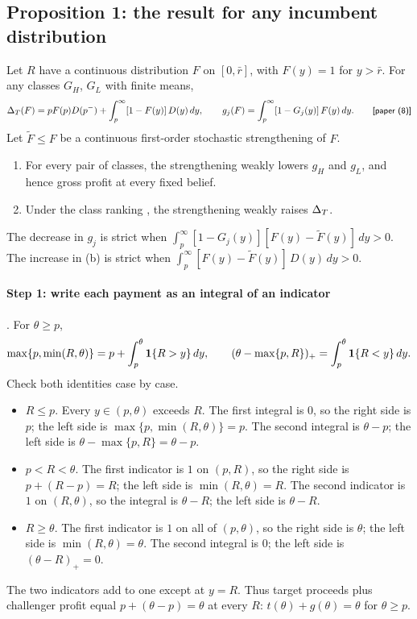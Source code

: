 \pagebreak
\subsection{Proposition 1: the result for any incumbent distribution}\label{sec:03_auction-prop1}

\begin{resultbox}
Let \(R\) have a continuous distribution \(F\) on \([0,\bar r]\), with \(F(y)=1\) for \(y>\bar r\). For any
classes \(G_H\), \(G_L\) with finite means,
\[
\DT(F)=pF(p)D(p^-)+\int_p^\infty[1-F(y)]\,D(y)\,dy,\qquad
g_j(F)=\int_p^\infty[1-G_j(y)]\,F(y)\,dy. \tag*{\paper{(8)}}
\]
Let \(\tilde F\le F\) be a continuous first-order stochastic strengthening of \(F\).
\begin{enumerate}[label=(\alph*)]
\item For every pair of classes, the strengthening weakly lowers \(g_H\) and \(g_L\), and hence gross
profit at every fixed belief.
\item Under the class ranking , the strengthening weakly raises \(\Delta_T\).
\end{enumerate}
The decrease in \(g_j\) is strict when \(\int_p^\infty[1-G_j(y)][F(y)-\tilde F(y)]\,dy>0\). The increase in
(b) is strict when \(\int_p^\infty[F(y)-\tilde F(y)]\,D(y)\,dy>0\).
\end{resultbox}

\paragraph{Step 1: write each payment as an integral of an indicator} . For \(\theta\ge p\),
\[
\max\{p,\min(R,\theta)\}=p+\int_p^\theta\mathbf{1}\{R>y\}\,dy,\qquad
(\theta-\max\{p,R\})_+=\int_p^\theta\mathbf{1}\{R<y\}\,dy.
\]
Check both identities case by case.
\begin{itemize}
\item \(R\le p\). Every \(y\in(p,\theta)\) exceeds \(R\). The first integral is \(0\), so the right side is
\(p\); the left side is \(\max\{p,\min(R,\theta)\}=p\). The second integral is \(\theta-p\); the left side
is \(\theta-\max\{p,R\}=\theta-p\).
\item \(p<R<\theta\). The first indicator is \(1\) on \((p,R)\), so the right side is \(p+(R-p)=R\); the
left side is \(\min(R,\theta)=R\). The second indicator is \(1\) on \((R,\theta)\), so the integral is
\(\theta-R\); the left side is \(\theta-R\).
\item \(R\ge\theta\). The first indicator is \(1\) on all of \((p,\theta)\), so the right side is
\(\theta\); the left side is \(\min(R,\theta)=\theta\). The second integral is \(0\); the left side is
\((\theta-R)_+=0\).
\end{itemize}
The two indicators add to one except at \(y=R\). Thus target proceeds plus challenger profit equal
\(p+(\theta-p)=\theta\) at every \(R\): \(t(\theta)+g(\theta)=\theta\) for \(\theta\ge p\).

